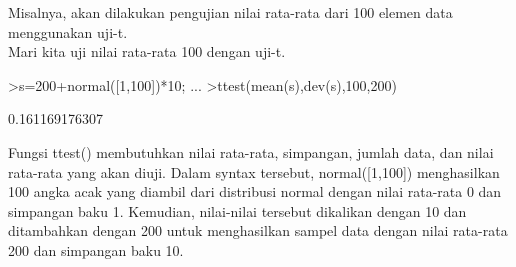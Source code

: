 \documentclass[a4paper,10pt]{article}
\begin{document}
\begin{eulernotebook}
\begin{eulercomment}
\begin{eulercomment}
\begin{eulercomment}
\begin{eulercomment}
\begin{eulercomment}
\begin{eulercomment}
\begin{eulercomment}
\begin{eulercomment}
\begin{eulercomment}
\begin{eulercomment}
\begin{eulercomment}
\begin{eulercomment}
\begin{eulercomment}
\begin{eulercomment}
\begin{eulercomment}
\begin{eulercomment}
\begin{eulercomment}
\begin{eulercomment}
\begin{eulercomment}
Misalnya, akan dilakukan pengujian nilai rata-rata dari 100 elemen
data menggunakan uji-t.\\
Mari kita uji nilai rata-rata 100 dengan uji-t.
\end{eulercomment}
\begin{eulerprompt}
>s=200+normal([1,100])*10; ...
>ttest(mean(s),dev(s),100,200)
\end{eulerprompt}
\begin{euleroutput}
  0.161169176307
\end{euleroutput}
\begin{eulercomment}
Fungsi ttest() membutuhkan nilai rata-rata, simpangan, jumlah data,
dan nilai rata-rata yang akan diuji. Dalam syntax tersebut,
normal([1,100]) menghasilkan 100 angka acak yang diambil dari
distribusi normal dengan nilai rata-rata 0 dan simpangan baku 1.
Kemudian, nilai-nilai tersebut dikalikan dengan 10 dan ditambahkan
dengan 200 untuk menghasilkan sampel data dengan nilai rata-rata 200
dan simpangan baku 10.


\end{eulercomment}
\end{eulercomment}
\end{eulercomment}
\end{eulercomment}
\end{eulercomment}
\end{eulercomment}
\end{eulercomment}
\end{eulercomment}
\end{eulercomment}
\end{eulercomment}
\end{eulercomment}
\end{eulercomment}
\end{eulercomment}
\end{eulercomment}
\end{eulercomment}
\end{eulercomment}
\end{eulercomment}
\end{eulercomment}
\end{eulercomment}
\end{eulernotebook}
\end{document}
